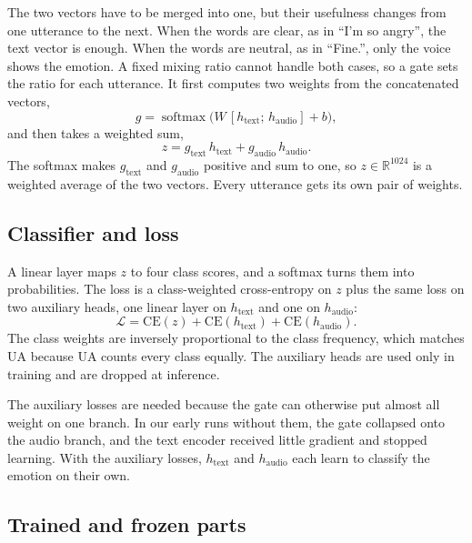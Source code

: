 \documentclass[conference]{IEEEtran}
\begin{document}
The two vectors have to be merged into one, but their usefulness changes from one utterance to the next. When the
words are clear, as in ``I'm so angry'', the text vector is enough. When the words are neutral, as in ``Fine.'',
only the voice shows the emotion. A fixed mixing ratio cannot handle both cases, so a gate sets the ratio for each
utterance. It first computes two weights from the concatenated vectors,
\begin{equation}
  g = \operatorname{softmax}\!\big(W\,[h_{\text{text}};\,h_{\text{audio}}] + b\big),
  \label{eq:gate}
\end{equation}
and then takes a weighted sum,
\begin{equation}
  z = g_{\text{text}}\,h_{\text{text}} + g_{\text{audio}}\,h_{\text{audio}}.
  \label{eq:fuse}
\end{equation}
The softmax makes $g_{\text{text}}$ and $g_{\text{audio}}$ positive and sum to one, so $z \in
\mathbb{R}^{1024}$ is a weighted average of the two vectors. Every utterance gets its own pair of weights.

\subsection{Classifier and loss}

A linear layer maps $z$ to four class scores, and a softmax turns them into probabilities. The loss is a
class-weighted cross-entropy on $z$ plus the same loss on two auxiliary heads, one linear layer on $h_{\text{text}}$
and one on $h_{\text{audio}}$:
\begin{equation}
  \mathcal{L} = \mathrm{CE}(z) + \mathrm{CE}(h_{\text{text}}) + \mathrm{CE}(h_{\text{audio}}).
  \label{eq:loss}
\end{equation}
The class weights are inversely proportional to the class frequency, which matches UA because UA counts every class
equally. The auxiliary heads are used only in training and are dropped at inference.

The auxiliary losses are needed because the gate can otherwise put almost all weight on one branch. In our early
runs without them, the gate collapsed onto the audio branch, and the text encoder received little gradient and
stopped learning. With the auxiliary losses, $h_{\text{text}}$ and $h_{\text{audio}}$ each learn to classify the
emotion on their own.

\subsection{Trained and frozen parts}
\end{document}

